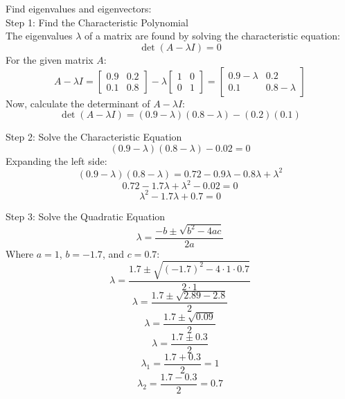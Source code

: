 \documentclass{article}
\begin{document}
 \\
\begin{flushleft} \\
Find eigenvalues and eigenvectors: \\
Step 1: Find the Characteristic Polynomial \\
The eigenvalues \(\lambda\) of a matrix are found by solving the characteristic equation:
\[
\det(A - \lambda I) = 0
\]
For the given matrix \( A \):
\[
A - \lambda I = \begin{bmatrix} 0.9 & 0.2 \\ 0.1 & 0.8 \end{bmatrix} - \lambda \begin{bmatrix} 1 & 0 \\ 0 & 1 \end{bmatrix} = \begin{bmatrix} 0.9 - \lambda & 0.2 \\ 0.1 & 0.8 - \lambda \end{bmatrix}
\]
Now, calculate the determinant of \( A - \lambda I \):
\[
\det(A - \lambda I) = (0.9 - \lambda)(0.8 - \lambda) - (0.2)(0.1)
\]

Step 2: Solve the Characteristic Equation \\
\[
(0.9 - \lambda)(0.8 - \lambda) - 0.02 = 0
\]
Expanding the left side:
\[
(0.9 - \lambda)(0.8 - \lambda) = 0.72 - 0.9\lambda - 0.8\lambda + \lambda^2
\]
\[
0.72 - 1.7\lambda + \lambda^2 - 0.02 = 0
\]
\[
\lambda^2 - 1.7\lambda + 0.7 = 0
\]

Step 3: Solve the Quadratic Equation \\
\[
\lambda = \frac{-b \pm \sqrt{b^2 - 4ac}}{2a}
\]
Where \( a = 1 \), \( b = -1.7 \), and \( c = 0.7 \):
\[
\lambda = \frac{1.7 \pm \sqrt{(-1.7)^2 - 4 \cdot 1 \cdot 0.7}}{2 \cdot 1}
\]
\[
\lambda = \frac{1.7 \pm \sqrt{2.89 - 2.8}}{2}
\]
\[
\lambda = \frac{1.7 \pm \sqrt{0.09}}{2}
\]
\[
\lambda = \frac{1.7 \pm 0.3}{2}
\]
\[
\lambda_1 = \frac{1.7 + 0.3}{2} = 1
\]
\[
\lambda_2 = \frac{1.7 - 0.3}{2} = 0.7
\]
\end{flushleft}
\end{document}
